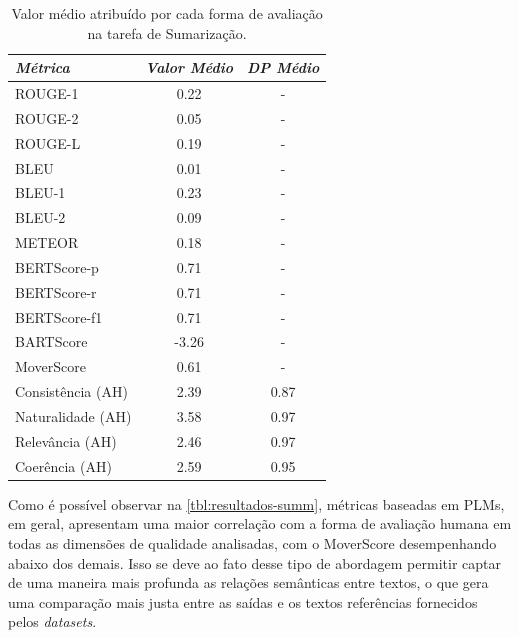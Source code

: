 \documentclass[cic,tc]{iiufrgs}
\begin{document}
\begin{table}[htbp]
    \caption{Valor médio atribuído por cada forma de avaliação na tarefa de Sumarização.}
    \centering
        \begin{tabular}{l c c}
          \hline
          \textit{Métrica} & \textit{Valor Médio} & \textit{DP Médio}\\
          \hline
          \hline
          ROUGE-1 & 0.22 & -\\
          ROUGE-2 & 0.05 & -\\
          ROUGE-L & 0.19 & -\\
          BLEU    & 0.01 & -\\
          BLEU-1  & 0.23 & -\\
          BLEU-2  & 0.09 & -\\
          METEOR  & 0.18 & -\\
          \hline
          BERTScore-p  &  0.71 & -\\
          BERTScore-r  &  0.71 & -\\
          BERTScore-f1 &  0.71 & -\\
          BARTScore    & -3.26 & -\\
          MoverScore   &  0.61 & -\\
          \hline
          Consistência (AH) & 2.39 & 0.87\\
          Naturalidade (AH) & 3.58 & 0.97\\
          Relevância (AH)   & 2.46 & 0.97\\
          Coerência (AH)    & 2.59 & 0.95\\
          \hline
        \end{tabular}
    \label{tbl:avg-métricas-summ}
\end{table}

Como é possível observar na \autoref{tbl:resultados-summ}, métricas baseadas em PLMs, em geral, apresentam uma maior correlação com a forma de avaliação humana em todas as dimensões de qualidade analisadas, com o MoverScore \cite{zhao2019moverscore} desempenhando abaixo dos demais. Isso se deve ao fato desse tipo de abordagem permitir captar de uma maneira mais profunda as relações semânticas entre textos, o que gera uma comparação mais justa entre as saídas e os textos referências fornecidos pelos \textit{datasets}.
\end{document}
